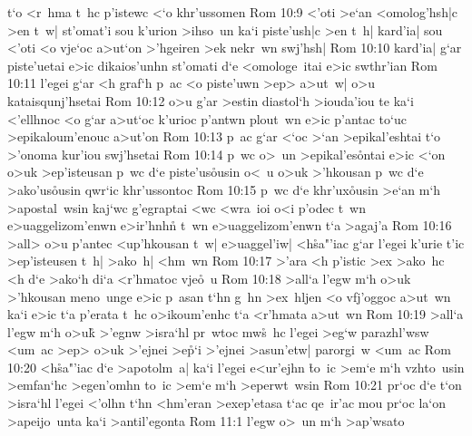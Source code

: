 t`o
<r~hma
t~hc
p'istewc
<`o
khr'ussomen\bibvsend
\vs Rom 10:9
<'oti
>e`an
<omolog'hsh|c
>en
t~w|
st'omat'i
sou
k'urion
>ihso~un
ka`i
piste'ush|c
>en
t~h|
kard'ia|
sou
<'oti
<o
vje`oc
a>ut`on
>'hgeiren
>ek
nekr~wn
swj'hsh|\bibvsend
\vs Rom 10:10
kard'ia|
g`ar
piste'uetai
e>ic
dikaios'unhn
st'omati
d`e
<omologe~itai
e>ic
swthr'ian\bibvsend
\vs Rom 10:11
l'egei
g`ar
<h
graf`h
p~ac
<o
piste'uwn
>ep>
a>ut~w|
o>u
kataisqunj'hsetai\bibvsend
\vs Rom 10:12
o>u
g'ar
>estin
diastol`h
>iouda'iou
te
ka`i
<'ellhnoc
<o
g`ar
a>ut`oc
k'urioc
p'antwn
plout~wn
e>ic
p'antac
to`uc
>epikaloum'enouc
a>ut'on\bibvsend
\vs Rom 10:13
p~ac
g`ar
<`oc
>`an
>epikal'eshtai
t`o
>'onoma
kur'iou
swj'hsetai\bibvsend
\vs Rom 10:14
p~wc
o>~un
>epikal'es\r{o}ntai
e>ic
<`on
o>uk
>ep'isteusan
p~wc
d`e
piste'us\r{o}usin
o<~u
o>uk
>'hkousan
p~wc
d`e
>ako'us\r{o}usin
qwr`ic
khr'ussontoc\bibvsend
\vs Rom 10:15
p~wc
d`e
khr'ux\r{o}usin
>e`an
m`h
>apostal~wsin
kaj`wc
g'egraptai
<wc
<wra~ioi
o<i
p'odec
t~wn
e>uaggelizom'enwn
e>ir'hnhn\r{}
t~wn
e>uaggelizom'enwn
t`a
>agaj'a\bibvsend
\vs Rom 10:16
>all>
o>u
p'antec
<up'hkousan
t~w|
e>uaggel'iw|
<h\r{s}a"'iac
g`ar
l'egei
k'urie
t'ic
>ep'isteusen
t~h|
>ako~h|
<hm~wn\bibvsend
\vs Rom 10:17
>'ara
<h
p'istic
>ex
>ako~hc
<h
d`e
>ako`h
di`a
<r'hmatoc
vje\r{o}~u\bibvsend
{}
\vs Rom 10:18
>all`a
l'egw
m`h
o>uk
>'hkousan
meno~unge
e>ic
p~asan
t`hn
g~hn
>ex~hljen
<o
vfj'oggoc
a>ut~wn
ka`i
e>ic
t`a
p'erata
t~hc
o>ikoum'enhc
t`a
<r'hmata
a>ut~wn\bibvsend
\vs Rom 10:19
>all`a
l'egw
m`h
o>uk\r{}
>'egnw
>isra`hl
pr~wtoc
mw\r{s}~hc
l'egei
>eg`w
parazhl'wsw
<um~ac
>ep>
o>uk
>'ejnei
>e\r{p}`i
>'ejnei
>asun'etw|
parorgi~w
<um~ac\bibvsend
\vs Rom 10:20
<h\r{s}a"'iac
d`e
>apotolm~a|
ka`i
l'egei
e<ur'ejhn
\r{t}o~ic
>em`e
m`h
vzhto~usin
>emfan`hc
>egen'omhn
to~ic
>em`e
m`h
>eperwt~wsin\bibvsend
\vs Rom 10:21
pr`oc
d`e
t`on
>isra`hl
l'egei
<'olhn
t`hn
<hm'eran
>exep'etasa
t`ac
qe~ir'ac
mou
pr`oc
la`on
>apeijo~unta
ka`i
>antil'egonta\bibvsend
\vs Rom 11:1
l'egw
o>~un
m`h
>ap'wsato
